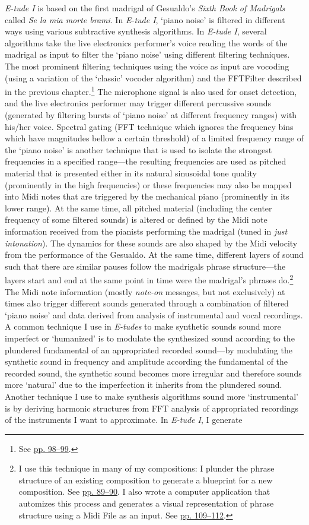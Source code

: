 \emph{E-tude I} is based on the first madrigal of Gesualdo's \emph{Sixth Book of Madrigals} called \emph{Se la mia morte brami}. In \emph{E-tude I}, `piano noise' is filtered in different ways using various subtractive synthesis algorithms. In \emph{E-tude I}, several algorithms take the live electronics performer's voice reading the words of the madrigal as input to filter the `piano noise' using different filtering techniques. The most prominent filtering techniques using the voice as input are vocoding (using a variation of the `classic' vocoder algorithm) and the FFTFilter described in the previous chapter.\footnote{See \hyperlink{fftfilter}{pp. 98--99}.} The microphone signal is also used for onset detection, and the live electronics performer may trigger different percussive sounds (generated by filtering bursts of `piano noise' at different frequency ranges) with his/her voice.  Spectral gating (FFT technique which ignores the frequency bins which have magnitudes bellow a certain threshold) of a limited frequency range of the `piano noise' is another technique that is used to isolate the strongest frequencies in a specified range---the resulting frequencies are used as pitched material that is presented either in its natural sinusoidal tone quality (prominently in the high frequencies) or these frequencies may also be mapped into Midi notes that are triggered by the mechanical piano (prominently in its lower range). At the same time, all pitched material (including the center frequency of some filtered sounds) is altered or defined by the Midi note information received from the pianists performing the madrigal (tuned in \emph{just intonation}). The dynamics for these sounds are also shaped by the Midi velocity from the performance of the Gesualdo. At the same time, different layers of sound such that there are similar pauses follow the madrigals phrase structure---the layers start and end at the same point in time were the madrigal's phrases do.\footnote{I use this technique in many of my compositions: I plunder the phrase structure of an existing composition to generate a blueprint for a new composition. See \hyperlink{macroplunder}{pp. 89--90}. I also wrote a computer application that automizes this process and generates a visual representation of phrase structure using a Midi File as an input. See \hyperlink{scorevisual}{pp. 109--112}.} The Midi note information (mostly \emph{note-on} messages, but not exclusively) at times also trigger different sounds generated through a combination of filtered `piano noise' and data derived from analysis of instrumental and vocal recordings. A common technique I use in \emph{E-tudes} to make synthetic sounds sound more imperfect or `humanized' is to modulate the synthesized sound according to the plundered fundamental of an appropriated recorded sound---by modulating the synthetic sound in frequency and amplitude according the fundamental of the recorded sound, the synthetic sound becomes more irregular and therefore sounds more `natural' due to the imperfection it inherits from the plundered sound. Another technique I use to make synthesis algorithms sound more `instrumental' is by deriving harmonic structures from FFT analysis of appropriated recordings of the instruments I want to approximate. In \emph{E-tude I}, I generate 